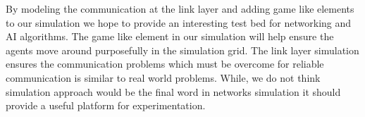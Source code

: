 \documentclass[12pt]{article}
\begin{document}
By modeling the communication at the link layer and adding game like elements to our simulation we hope to provide an interesting test bed for networking and AI algorithms. The game like element in our simulation will help ensure the agents move around purposefully in the simulation grid. The link layer simulation ensures the communication problems which must be overcome for reliable communication is similar to real world problems. While, we do not think simulation approach would be the final word in networks simulation it should provide a useful platform for experimentation.











% 
% 
\end{document}
